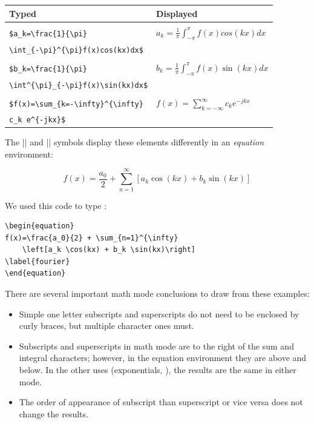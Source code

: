 \begin{center}
\begin{tabular}{l|l}
Typed                   & Displayed\\\hline
\\
\verb|$a_k=\frac{1}{\pi}|                  & $a_k = \frac{1}{\pi}\int_{-\pi}^{\pi}f(x)cos(kx)dx$\\
\verb|\int_{-\pi}^{\pi}f(x)cos(kx)dx$|      & \\[4pt]
\hline
\\
\verb|$b_k=\frac{1}{\pi}|                  & $b_k = \frac{1}{\pi}\int^{\pi}_{-\pi}f(x)\sin(kx)dx$\\
\verb|\int^{\pi}_{-\pi}f(x)\sin(kx)dx$|      & \\[4pt]
\hline
\\
\verb|$f(x)=\sum_{k=-\infty}^{\infty}| & $f(x)=\sum_{k=-\infty}^{\infty}c_k e^{-jkx}$\\
\verb|c_k e^{-jkx}$|                 & \\[4pt]
\end{tabular}
\end{center}

The |\sum| and |\int| symbols display these elements differently in an \emph{equation} environment:

\begin{equation}
f(x)=\frac{a_0}{2} + \sum_{n=1}^{\infty}\left[a_k \cos(kx) + b_k \sin(kx)\right]
\label{fourier}
\end{equation}

We used this code to type :
\begin{Verbatim}
\begin{equation}
f(x)=\frac{a_0}{2} + \sum_{n=1}^{\infty}
    \left[a_k \cos(kx) + b_k \sin(kx)\right]
\label{fourier}
\end{equation}
\end{Verbatim}

There are several important math mode conclusions to draw from these examples:
\begin{itemize}
  \item Simple one letter subscripts and superscripts do not need to be enclosed by curly braces, but multiple character ones must.
  \item Subscripts and superscripts in math mode are to the right of
    the sum and integral characters; however, in the equation
    environment they are above and below.  In the other uses
    (exponentials, \etc), the results are the same in either mode.
  \item The order of appearance of subscript than superscript or vice versa does not change the results.
\end{itemize}


